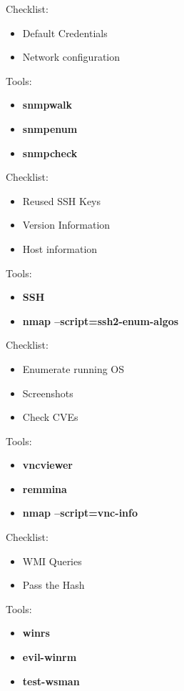 \documentclass[a4paper,10pt]{article}
\begin{document}
\begin{multicols}{2}
\begin{tcolorbox}[breakable, title=SMTP]
\begin{itemize}
\end{itemize}
\end{tcolorbox}
\begin{tcolorbox}[breakable, title=SNMP]
Checklist:
\begin{itemize}
	\itemsep0em
	\item Default Credentials
	\item Network configuration
\end{itemize}
Tools:
\begin{itemize}
	\itemsep0em
	\item \textbf{snmpwalk}
	\item \textbf{snmpenum}
	\item \textbf{snmpcheck}
\end{itemize}
\end{tcolorbox}
\begin{tcolorbox}[breakable,title=SSH]
Checklist:
\begin{itemize}
	\itemsep0em
	\item Reused SSH Keys %
	\item Version Information
	\item Host information
\end{itemize}
Tools:
\begin{itemize}
	\itemsep0em
	\item \textbf{SSH}
	\item \textbf{nmap --script=ssh2-enum-algos}
\end{itemize}
\end{tcolorbox}
\begin{tcolorbox}[breakable, title=VNC]
Checklist:
\begin{itemize}
	\itemsep0em
	\item Enumerate running OS
	\item Screenshots
	\item Check CVEs
\end{itemize}
Tools:
\begin{itemize}
	\itemsep0em
	\item \textbf{vncviewer}
	\item \textbf{remmina}
	\item \textbf{nmap --script=vnc-info}
\end{itemize}
\end{tcolorbox}
\begin{tcolorbox}[breakable,title=WinRM]
Checklist:
\begin{itemize}
	\itemsep0em
	\item WMI Queries
	\item Pass the Hash
\end{itemize}
Tools:
\begin{itemize}
	\itemsep0em
	\item \textbf{winrs}
	\item \textbf{evil-winrm}
	\item \textbf{test-wsman}
\end{itemize}
\end{tcolorbox}
\end{multicols}
\end{document}
